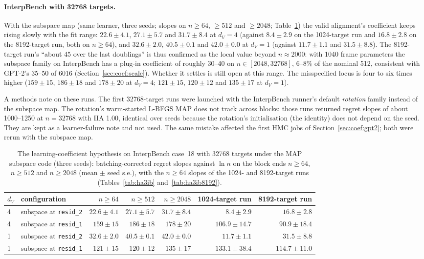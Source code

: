 \documentclass[11pt,a4paper]{article}
\newcommand{\dv}{d_V}
\begin{document}
\paragraph{InterpBench with 32768 targets.} With the subspace map (same learner, three seeds; slopes on $n\ge64$, $\ge512$ and $\ge2048$; Table~\ref{tab:ha3ib32768}) the valid alignment's coefficient keeps rising slowly with the fit range: $22.6\pm4.1$, $27.1\pm5.7$ and $31.7\pm8.4$ at $\dv=4$ (against $8.4\pm2.9$ on the 1024-target run and $16.8\pm2.8$ on the 8192-target run, both on $n\ge64$), and $32.6\pm2.0$, $40.5\pm0.1$ and $42.0\pm0.0$ at $\dv=1$ (against $11.7\pm1.1$ and $31.5\pm8.8$). The 8192-target run's ``about 45 over the last doublings'' is thus confirmed as the local value beyond $n\approx2000$: with 1040 frame parameters the subspace family on InterpBench has a plug-in coefficient of roughly 30--40 on $n\in[2048,32768]$, 6--8\% of the nominal 512, consistent with GPT-2's 35--50 of 6016 (Section~\ref{sec:coef:scale}). Whether it settles is still open at this range. The misspecified locus is four to six times higher ($159\pm15$, $186\pm18$ and $178\pm20$ at $\dv=4$; $121\pm15$, $120\pm12$ and $135\pm17$ at $\dv=1$).

A methods note on these runs. The first 32768-target runs were launched with the InterpBench runner's default \emph{rotation} family instead of the subspace map. The rotation's warm-started L-BFGS MAP does not track across blocks: those runs returned regret slopes of about 1000--1250 at $n=32768$ with IIA 1.00, identical over seeds because the rotation's initialisation (the identity) does not depend on the seed. They are kept as a learner-failure note and not used. The same mistake affected the first HMC jobs of Section~\ref{sec:coef:gpt2}; both were rerun with the subspace map.

\begin{table}[t]
\centering
\footnotesize
\caption{The learning-coefficient hypothesis on InterpBench case~18 with 32768 targets under the MAP subspace code (three seeds): batching-corrected regret slopes against $\ln n$ on the block ends $n\ge64$, $n\ge512$ and $n\ge2048$ (mean $\pm$ seed s.e.), with the $n\ge64$ slopes of the 1024- and 8192-target runs (Tables~\ref{tab:ha3ib} and~\ref{tab:ha3ib8192}).}
\label{tab:ha3ib32768}
\begin{tabular}{llrrrrr}
\toprule
$\dv$ & configuration & $n\ge64$ & $n\ge512$ & $n\ge2048$ & 1024-target run & 8192-target run \\
\midrule
4 & subspace at \texttt{resid\_2} & $22.6\pm4.1$ & $27.1\pm5.7$ & $31.7\pm8.4$ & $8.4\pm2.9$ & $16.8\pm2.8$ \\
4 & subspace at \texttt{resid\_1} & $159\pm15$ & $186\pm18$ & $178\pm20$ & $106.9\pm14.7$ & $90.9\pm18.4$ \\
\midrule
1 & subspace at \texttt{resid\_2} & $32.6\pm2.0$ & $40.5\pm0.1$ & $42.0\pm0.0$ & $11.7\pm1.1$ & $31.5\pm8.8$ \\
1 & subspace at \texttt{resid\_1} & $121\pm15$ & $120\pm12$ & $135\pm17$ & $133.1\pm38.4$ & $114.7\pm11.0$ \\
\bottomrule
\end{tabular}
\end{table}
\end{document}
